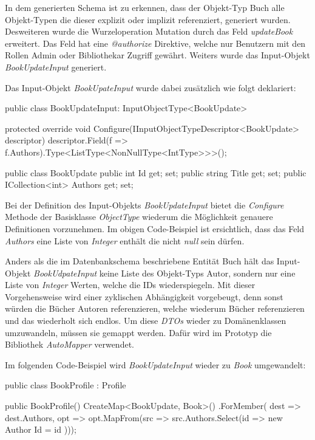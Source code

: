 In dem generierten Schema ist zu erkennen, dass der Objekt-Typ Buch alle Objekt-Typen die dieser explizit oder implizit referenziert, generiert wurden.
Desweiteren wurde die Wurzeloperation Mutation durch das Feld \textit{updateBook} erweitert.
Das Feld hat eine \textit{@authorize} Direktive, welche nur Benutzern mit den Rollen Admin oder Bibliothekar Zugriff gewährt.
Weiters wurde das Input-Objekt \textit{BookUpdateInput} generiert.
\newline

Das Input-Objekt \textit{BookUpateInput} wurde dabei zusätzlich wie folgt deklariert:
\begin{JsCode}
public class BookUpdateInput: InputObjectType<BookUpdate> {

    protected override void Configure(IInputObjectTypeDescriptor<BookUpdate> descriptor) {
        descriptor.Field(f => f.Authors).Type<ListType<NonNullType<IntType>>>();
    }
}

public class BookUpdate {
    public int Id { get; set; }
    public string Title { get; set; }
    public ICollection<int> Authors { get; set; }
}
\end{JsCode}

Bei der Definition des Input-Objekts \textit{BookUpdateInput} bietet die \textit{Configure} Methode der Basisklasse \textit{ObjectType} wiederum die Möglichkeit genauere Definitionen vorzunehmen.
Im obigen Code-Beispiel ist ersichtlich, dass das Feld \textit{Authors} eine Liste von \textit{Integer} enthält die nicht \textit{null} sein dürfen.
\newline

Anders als die im Datenbankschema beschriebene Entität Buch hält das Input-Objekt \textit{BookUdpateInput} keine Liste des Objekt-Typs Autor, sondern nur eine Liste von \textit{Integer} Werten, welche die IDs wiederspiegeln.
Mit dieser Vorgehensweise wird einer zyklischen Abhängigkeit vorgebeugt, denn sonst würden die Bücher Autoren referenzieren, welche wiederum Bücher referenzieren und das wiederholt sich endlos.
Um diese \textit{DTOs} wieder zu Domänenklassen umzuwandeln, müssen sie gemappt werden.
Dafür wird im Prototyp die Bibliothek \textit{AutoMapper} verwendet.

Im folgenden Code-Beispiel wird \textit{BookUpdateInput} wieder zu \textit{Book} umgewandelt:
\begin{JsCode}
public class BookProfile : Profile {
    public BookProfile() {
        CreateMap<BookUpdate, Book>()
            .ForMember(
            dest => dest.Authors,
            opt => opt.MapFrom(src => src.Authors.Select(id => new Author { Id = id })));
    }

}
\end{JsCode}

